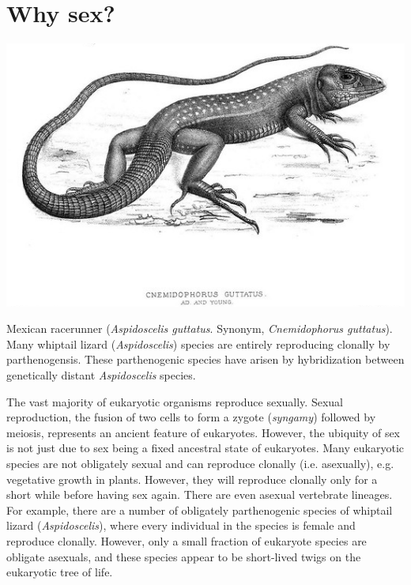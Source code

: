 \section{Why sex?}
\begin{marginfigure}
\begin{center}
\includegraphics[width= \textwidth]{illustration_images/multiple_sel_loci/whiptail_lizard/Cnemidophorus_guttatus.png}
\end{center}
\caption{Mexican racerunner ({\it Aspidoscelis guttatus}. Synonym, {\it Cnemidophorus guttatus}). Many whiptail lizard ({\it Aspidoscelis}) species are entirely reproducing clonally by parthenogensis. These parthenogenic species have arisen by hybridization between genetically distant {\it Aspidoscelis} species. } \label{fig: whiptail_lizard}
\end{marginfigure}
The vast majority of eukaryotic organisms reproduce sexually. Sexual reproduction, the fusion of two cells to form a zygote  ({\it syngamy}) followed by meiosis, represents an ancient feature of eukaryotes. However, the ubiquity of sex is not just due to sex being a fixed ancestral state of eukaryotes. Many eukaryotic species are not obligately sexual and can reproduce clonally (i.e. asexually), e.g. vegetative growth in plants. However, they will reproduce clonally only for a short while before having sex again. There are even asexual vertebrate lineages. For example, there are a number of obligately parthenogenic species of whiptail lizard ({\it Aspidoscelis}), where every individual in the species is female and reproduce clonally.  However, only a small fraction of  eukaryote species are obligate asexuals, and these species appear to be short-lived twigs on the eukaryotic tree of life. 

